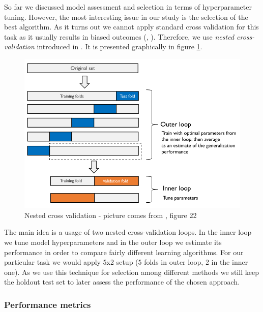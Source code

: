 \documentclass[shortabstract, english, mgr]{iithesis}
\begin{document}
So far we discussed model assessment and selection in terms of hyperparameter tuning. However, the most interesting issue in our study is the selection of the best algorithm. As it turns out we cannot apply standard cross validation for this task as it usually results in biased outcomes (\cite{ModelSelection}, \cite{cvOverfit}). Therefore, we use \textit{nested cross-validation} introduced in \cite{nestedCV}. It is presented graphically in figure \ref{fig:nestedCV}.

\begin{figure}
\centering
\includegraphics[width=\textwidth]{images/nestedCV.png}
\caption{Nested cross validation - picture comes from \cite{ModelSelection}, figure 22}
\label{fig:nestedCV}
\end{figure}

The main idea is a usage of two nested cross-validation loops. In the inner loop we tune model hyperparameters and in the outer loop we estimate its performance in order to compare fairly different learning algorithms. For our particular task we would apply 5x2 setup (5 folds in outer loop, 2 in the inner one). As we use this technique for selection among different methods we still keep the holdout test set to later assess the performance of the chosen approach.

\subsubsection{Performance metrics}
\end{document}
